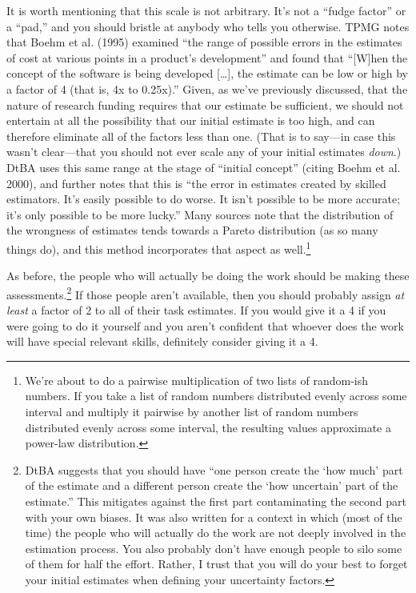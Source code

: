 \documentclass[12pt,oneside]{book}
\begin{document}
It is worth mentioning that this scale is not arbitrary. It's not a ``fudge factor'' or a ``pad,'' and you should bristle at anybody who tells you otherwise. TPMG notes that Boehm et al. (1995) examined ``the range of possible errors in the estimates of cost at various points in a product's development'' and found that ``[W]hen the concept of the software is being developed [{\ldots}], the estimate can be low or high by a factor of 4 (that is, 4x to 0.25x).'' Given, as we've previously discussed, that the nature of research funding requires that our estimate be sufficient, we should not entertain at all the possibility that our initial estimate is too high, and can therefore eliminate all of the factors less than one. (That is to say---in case this wasn't clear---that you should not ever scale any of your initial estimates \emph{down}.) DtBA uses this same range at the stage of ``initial concept'' (citing Boehm et al. 2000), and further notes that this is ``the error in estimates created by skilled estimators. It's easily possible to do worse. It isn't possible to be more accurate; it's only possible to be more lucky.'' Many sources note that the distribution of the wrongness of estimates tends towards a Pareto distribution (as so many things do), and this method incorporates that aspect as well.\footnote{
We're about to do a pairwise multiplication of two lists of random-ish numbers. If you take a list of random numbers distributed evenly across some interval and multiply it pairwise by another list of random numbers distributed evenly across some interval, the resulting values approximate a power-law distribution.}

As before, the people who will actually be doing the work should be making these assessments.\footnote{
DtBA suggests that you should have ``one person create the `how much' part of the estimate and a different person create the `how uncertain' part of the estimate.'' This mitigates against the first part contaminating the second part with your own biases. It was also written for a context in which (most of the time) the people who will actually do the work are not deeply involved in the estimation process. You also probably don't have enough people to silo some of them for half the effort. Rather, I trust that you will do your best to forget your initial estimates when defining your uncertainty factors.}
If those people aren't available, then you should probably assign \emph{at least} a factor of 2 to all of their task estimates. If you would give it a 4 if you were going to do it yourself and you aren't confident that whoever does the work will have special relevant skills, definitely consider giving it a 4.
\end{document}

